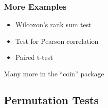 \begin{frame}
	\frametitle{More Examples}
	
	\begin{itemize}
		\item Wilcoxon's rank sum test
		\item Test for Pearson correlation
		\item Paired t-test
	\end{itemize}
	
	\vfill
	
	Many more in the ``coin'' package
\end{frame}

\subsection{Permutation Tests}
